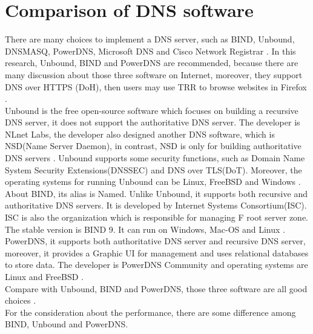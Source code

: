 \section{Comparison of DNS software}

There are many choices to implement a DNS server, such as BIND, Unbound, DNSMASQ, PowerDNS, Microsoft DNS and Cisco Network Registrar \cite{DNS_software_wiki} \cite{Bind_dnsmasq_PowerDNS_Unbound}. In this research, Unbound, BIND and PowerDNS are recommended, because there are many discussion about those three software on Internet, moreover, they support DNS over HTTPS (DoH), then users may use TRR to browse websites in Firefox \cite{Building_DOH} \cite{DNS_over_HTTPS_servers}.
\\

Unbound is the free open-source software which focuses on building a recursive DNS server, it does not support the authoritative DNS server. The developer is NLnet Labs, the developer also designed another DNS software, which is NSD(Name Server Daemon), in contrast, NSD is only for building authoritative DNS servers \cite{NSD_wiki}. Unbound supports some security functions, such as Domain Name System Security Extensions(DNSSEC) and DNS over TLS(DoT). Moreover, the operating systems for running Unbound can be Linux, FreeBSD and Windows \cite{Unbound_wiki}.
\\

About BIND, its alias is Named. Unlike Unbound, it supports both recursive and authoritative DNS servers. It is developed by Internet Systems Consortium(ISC). ISC is also the organization which is responsible for managing F root server zone. The stable version is BIND 9. It can run on Windows, Mac-OS and Linux \cite{BIND_wiki}.
\\

PowerDNS, it supports both authoritative DNS server and recursive DNS server, moreover, it provides a Graphic UI for management and uses relational databases to store data. The developer is PowerDNS Community and operating systems are Linux and FreeBSD  \cite{PowerDNS_wiki}.
\\

Compare with Unbound, BIND and PowerDNS, those three software are all good choices \cite{Compare_the_different_DNS_servers}.
\\

For the consideration about the performance, there are some difference among BIND, Unbound and PowerDNS.
\\

